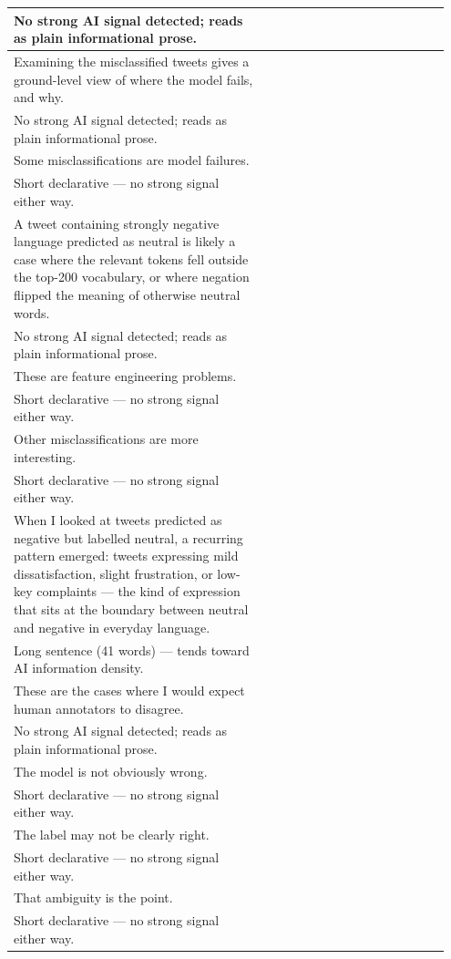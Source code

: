 \documentclass[11pt]{article}
\begin{document}
\begin{longtable}{|p{0.55\linewidth}|p{0.40\linewidth}|}
\hline
No strong AI signal detected; reads as plain informational prose. & \\
\hline
Examining the misclassified tweets gives a ground-level view of where the model fails, and why. & \\[2pt]
\hline
No strong AI signal detected; reads as plain informational prose. & \\
\hline
Some misclassifications are model failures. & \\[2pt]
\hline
Short declarative --- no strong signal either way. & \\
\hline
A tweet containing strongly negative language predicted as neutral is likely a case where the relevant tokens fell outside the top-200 vocabulary, or where negation flipped the meaning of otherwise neutral words. & \\[2pt]
\hline
No strong AI signal detected; reads as plain informational prose. & \\
\hline
These are feature engineering problems. & \\[2pt]
\hline
Short declarative --- no strong signal either way. & \\
\hline
Other misclassifications are more interesting. & \\[2pt]
\hline
Short declarative --- no strong signal either way. & \\
\hline
When I looked at tweets predicted as negative but labelled neutral, a recurring pattern emerged: tweets expressing mild dissatisfaction, slight frustration, or low-key complaints --- the kind of expression that sits at the boundary between neutral and negative in everyday language. & \\[2pt]
\hline
Long sentence (41 words) --- tends toward AI information density. & \\
\hline
These are the cases where I would expect human annotators to disagree. & \\[2pt]
\hline
No strong AI signal detected; reads as plain informational prose. & \\
\hline
The model is not obviously wrong. & \\[2pt]
\hline
Short declarative --- no strong signal either way. & \\
\hline
The label may not be clearly right. & \\[2pt]
\hline
Short declarative --- no strong signal either way. & \\
\hline
That ambiguity is the point. & \\[2pt]
\hline
Short declarative --- no strong signal either way. & \\

\end{longtable}
\end{document}
